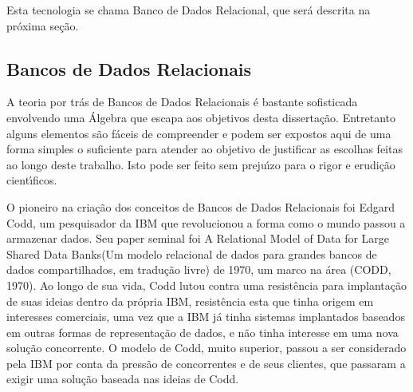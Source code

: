 \documentclass[
12pt,		%
openright,	%
twoside,  %
a4paper,			%
chapter=TITLE,		%
english,			%
french,				%
spanish,			%
brazil				%
]{USPSC-classe/USPSC}
\begin{document}
Esta tecnologia se chama \textquotedbl Banco de Dados Relacional\textquotedbl , que ser\'a descrita na pr\'oxima se\c{c}\~ao.

















\subsection[Bancos de Dados Relacionais]{Bancos de Dados Relacionais}\label{Bancos de Dados Relacionais}
A teoria por tr\'as de Bancos de Dados Relacionais \'e bastante sofisticada envolvendo uma \'Algebra que escapa aos objetivos desta disserta\c{c}\~ao. Entretanto alguns elementos s\~ao f\'aceis de compreender e podem ser expostos aqui de uma forma simples o suficiente para atender ao objetivo de justificar as escolhas feitas ao longo deste trabalho. Isto pode ser feito sem preju\'{\i}zo para o rigor e erudi\c{c}\~ao cient\'{\i}ficos.

















O pioneiro na cria\c{c}\~ao dos conceitos de Bancos de Dados Relacionais foi Edgard Codd, um pesquisador da IBM que revolucionou a forma como o mundo passou a armazenar dados. Seu paper seminal foi  \textquotedbl A Relational Model of Data for Large Shared Data Banks\textquotedbl  (\textquotedbl Um modelo relacional de dados para grandes bancos de dados compartilhados\textquotedbl , em tradu\c{c}\~ao livre) de 1970, um marco na \'area (CODD, 1970). Ao longo de sua vida, Codd lutou contra uma resist\^encia para implanta\c{c}\~ao de suas ideias dentro da pr\'opria IBM, resist\^encia esta que tinha origem em interesses comerciais, uma vez que a IBM j\'a tinha sistemas implantados baseados em outras formas de representa\c{c}\~ao de dados, e n\~ao tinha interesse em uma nova solu\c{c}\~ao concorrente. O modelo de Codd, muito superior, passou a ser considerado pela IBM por conta da press\~ao de concorrentes e de seus clientes, que passaram a exigir uma solu\c{c}\~ao baseada nas ideias de Codd.
\end{document}
